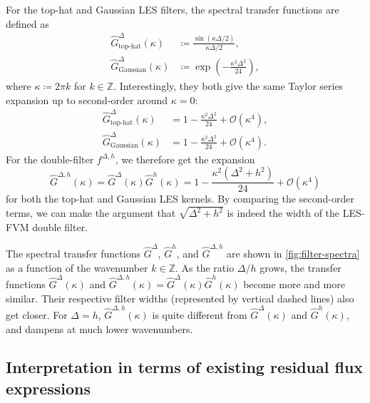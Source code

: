 \documentclass[preprint,twocolumn,5p]{elsarticle}
\begin{document}
For the top-hat and Gaussian LES filters, the spectral transfer functions are
defined as \cite{popeTurbulentFlows2000}
\begin{align}
    \hat{G}^\Delta_\text{top-hat}(\kappa)
    & \coloneq \frac{\sin(\kappa \Delta / 2)}{\kappa \Delta / 2}, \\
    \hat{G}^\Delta_\text{Gaussian}(\kappa)
    & \coloneq \exp\left(-\frac{\kappa^2 \Delta^2}{24}\right),
\end{align}
where $\kappa \coloneq 2 \pi k$ for $k \in \mathbb{Z}$.
Interestingly, they both give the same Taylor series expansion up to second-order around $\kappa = 0$:
\begin{align}
    \hat{G}^\Delta_\text{top-hat}(\kappa)
    & = 1 - \frac{\kappa^2 \Delta^2}{24} + \mathcal{O}(\kappa^4), \\
    \hat{G}^\Delta_\text{Gaussian}(\kappa)
    & = 1 - \frac{\kappa^2 \Delta^2}{24} + \mathcal{O}(\kappa^4).
\end{align}
For the double-filter $f^{\Delta, h}$, we therefore get the expansion
\begin{equation}
    \hat{G}^{\Delta, h}(\kappa)
    = \hat{G}^\Delta(\kappa) \hat{G}^h(\kappa)
    = 1 - \frac{\kappa^2 (\Delta^2 + h^2)}{24} + \mathcal{O}(\kappa^4)
\end{equation}
for both the top-hat and Gaussian LES kernels.
By comparing the second-order terms, we can make the argument that
$\sqrt{\Delta^2 + h^2}$ is indeed the width of the LES-FVM double filter.

The spectral transfer functions $\hat{G}^\Delta$, $\hat{G}^h$, and $\hat{G}^{\Delta, h}$ are shown in
\cref{fig:filter-spectra} as a function of the wavenumber $k \in \mathbb{Z}$.
As the ratio $\Delta / h$ grows, the transfer functions $\hat{G}^\Delta(\kappa)$ and
$\hat{G}^{\Delta, h}(\kappa) = \hat{G}^\Delta(\kappa) \hat{G}^h(\kappa)$ become more and more similar.
Their respective filter widths (represented by vertical dashed lines) also get
closer. For $\Delta = h$, $\hat{G}^{\Delta, h}(\kappa)$
is quite different from $\hat{G}^\Delta(\kappa)$ and $\hat{G}^h(\kappa)$,
and dampens at much lower wavenumbers.

\subsection{Interpretation in terms of existing residual flux expressions}
\end{document}
